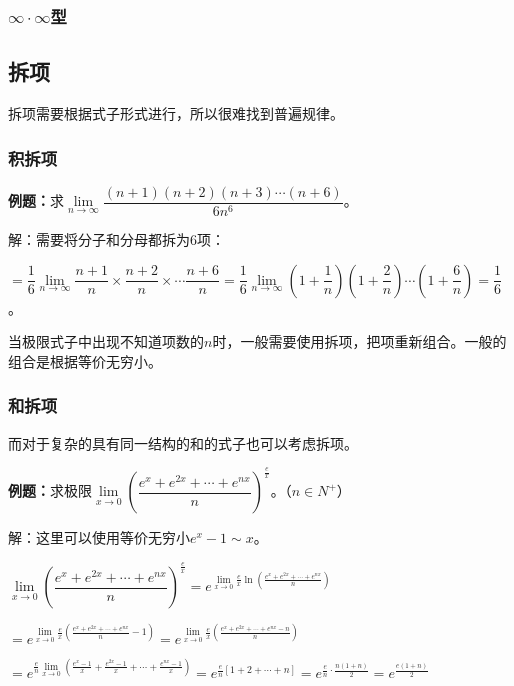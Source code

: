 \documentclass[UTF8, 12pt]{ctexart}
\begin{document}
\subsubsection{\texorpdfstring{$\infty\cdot\infty$}\ 型}

\subsection{拆项}

拆项需要根据式子形式进行，所以很难找到普遍规律。

\subsubsection{积拆项}

\textbf{例题：}求$\lim\limits_{n\to\infty}\dfrac{(n+1)(n+2)(n+3)\cdots(n+6)}{6n^6}$。

解：需要将分子和分母都拆为6项：

$=\dfrac{1}{6}\lim\limits_{n\to\infty}\dfrac{n+1}{n}\times\dfrac{n+2}{n}\times\cdots\dfrac{n+6}{n}=\dfrac{1}{6}\lim\limits_{n\to\infty}(1+\dfrac{1}{n})(1+\dfrac{2}{n})\cdots(1+\dfrac{6}{n})=\dfrac{1}{6}$。

当极限式子中出现不知道项数的$n$时，一般需要使用拆项，把项重新组合。一般的组合是根据等价无穷小。

\subsubsection{和拆项}

而对于复杂的具有同一结构的和的式子也可以考虑拆项。

\textbf{例题：}求极限$\lim\limits_{x\to 0}\left(\dfrac{e^x+e^{2x}+\cdots+e^{nx}}{n}\right)^{\frac{e}{x}}$。（$n\in N^+$）

解：这里可以使用等价无穷小$e^x-1\sim x$。

$\lim\limits_{x\to 0}\left(\dfrac{e^x+e^{2x}+\cdots+e^{nx}}{n}\right)^{\frac{e}{x}}=e^{\lim\limits_{x\to 0}\frac{e}{x}\ln\left(\frac{e^x+e^{2x}+\cdots+e^{nx}}{n}\right)}$

$=e^{\lim\limits_{x\to 0}\frac{e}{x}\left(\frac{e^x+e^{2x}+\cdots+e^{nx}}{n}-1\right)}=e^{\lim\limits_{x\to 0}\frac{e}{x}\left(\frac{e^x+e^{2x}+\cdots+e^{nx}-n}{n}\right)}$

$=e^{\frac{e}{n}\lim\limits_{x\to 0}\left(\frac{e^x-1}{x}+\frac{e^{2x}-1}{x}+\cdots+\frac{e^{nx}-1}{x}\right)}=e^{\frac{e}{n}[1+2+\cdots+n]}=e^{\frac{e}{n}\cdot\frac{n(1+n)}{2}}=e^{\frac{e(1+n)}{2}}$
\end{document}

